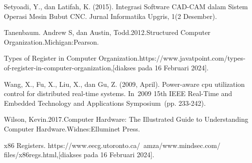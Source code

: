 Setyoadi, Y., dan Latifah, K. (2015). Integrasi Software CAD-CAM dalam Sistem Operasi Mesin Bubut CNC. Jurnal Informatika Upgris, 1(2 Desember).

Tanenbaum. Andrew S, dan Austin, Todd.2012.Structured Computer Organization.Michigan:Pearson.

Types of Register in Computer Organization.https://www.javatpoint.com/types-of-register-in-computer-organization,[diakses pada 16 Februari 2024].

Wang, X., Fu, X., Liu, X., dan Gu, Z. (2009, April). Power-aware cpu utilization control for distributed real-time systems. In 2009 15th IEEE Real-Time and Embedded Technology and Applications Symposium (pp. 233-242).

Wilson, Kevin.2017.Computer Hardware: The Illustrated Guide to Understanding Computer Hardware.Widnes:Elluminet Press.

x86 Registers.
https://www.eecg.utoronto.ca/~amza/www.mindsec.com/
\linebreak
files/x86regs.html,[diakses pada 16 Februari 2024].
